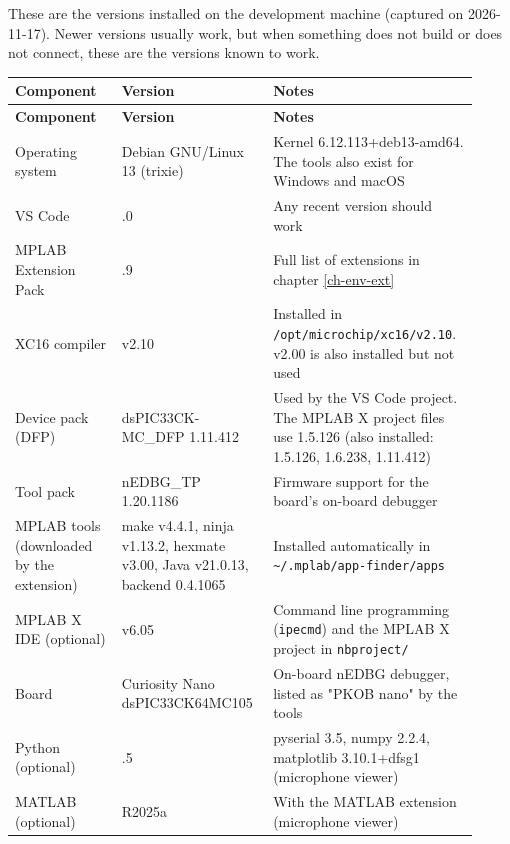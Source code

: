 \documentclass[
  11pt,
  letterpaper,
  oneside,
  DIV=13,               %
  parskip=half,          %
  headings=normal,
  chapterprefix=false,
  toc=listof,
  numbers=noenddot,
]{scrbook}
\begin{document}
These are the versions installed on the development machine (captured on 2026-11-17). Newer versions usually work, but when something does not build or does not connect, these are the versions known to work.
\begin{longtable}{>{\raggedright\arraybackslash}p{0.22\linewidth}>{\raggedright\arraybackslash}p{0.30\linewidth}>{\raggedright\arraybackslash}p{0.40\linewidth}}
\toprule
\textbf{Component} & \textbf{Version} & \textbf{Notes} \\
\midrule
\endfirsthead
\toprule
\textbf{Component} & \textbf{Version} & \textbf{Notes} \\
\midrule
\endhead
\bottomrule
\endlastfoot
Operating system & Debian GNU/Linux 13 (trixie) & Kernel 6.12.113+deb13-amd64. The tools also exist for Windows and macOS \\
VS Code & 1.144.0 & Any recent version should work \\
MPLAB Extension Pack & 1.2.9 & Full list of extensions in chapter \ref{ch-env-ext} \\
XC16 compiler & v2.10 & Installed in \texttt{/\allowbreak{}opt/\allowbreak{}microchip/\allowbreak{}xc16/\allowbreak{}v2.\allowbreak{}10}. v2.00 is also installed but not used \\
Device pack (DFP) & dsPIC33CK-MC\_DFP 1.11.412 & Used by the VS Code project. The MPLAB X project files use 1.5.126 (also installed: 1.5.126, 1.6.238, 1.11.412) \\
Tool pack & nEDBG\_TP 1.20.1186 & Firmware support for the board's on-board debugger \\
MPLAB tools (downloaded by the extension) & make v4.4.1, ninja v1.13.2, hexmate v3.00, Java v21.0.13, backend 0.4.1065 & Installed automatically in \texttt{\textasciitilde{}/\allowbreak{}.\allowbreak{}mplab/\allowbreak{}app-\allowbreak{}finder/\allowbreak{}apps} \\
MPLAB X IDE (optional) & v6.05 & Command line programming (\texttt{ipecmd}) and the MPLAB X project in \texttt{nbproject/\allowbreak{}} \\
Board & Curiosity Nano dsPIC33CK64MC105 & On-board nEDBG debugger, listed as "PKOB nano" by the tools \\
Python (optional) & 3.13.5 & pyserial 3.5, numpy 2.2.4, matplotlib 3.10.1+dfsg1 (microphone viewer) \\
MATLAB (optional) & R2025a & With the MATLAB extension (microphone viewer) \\
\end{longtable}
\end{document}
